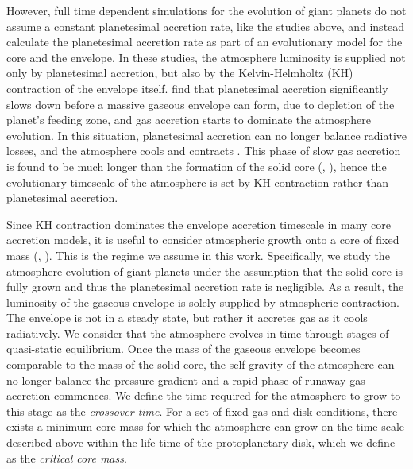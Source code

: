 \documentclass[apj]{emulateapj}
\begin{document}
However, full time dependent simulations for the evolution of giant planets do not assume a constant planetesimal accretion rate, like the studies above, and instead calculate the planetesimal accretion rate as part of an evolutionary model for the core and the envelope. In these studies, the atmosphere luminosity is supplied not only by planetesimal accretion, but also by the Kelvin-Helmholtz (KH) contraction of the envelope itself. \citet{pollack96} find that planetesimal accretion significantly slows down before a massive gaseous envelope can form, due to depletion of the planet's feeding zone, and gas accretion starts to dominate the atmosphere evolution. In this situation, planetesimal accretion can no longer balance radiative losses, and the atmosphere cools and contracts . This phase of slow gas accretion is found to be much longer than the formation of the solid core (\citealt{pollack96}, \citealt{alibert05}), hence the evolutionary timescale of the atmosphere is set by KH contraction rather than planetesimal accretion.

Since KH contraction dominates the envelope accretion timescale in many core accretion models, it is useful to consider atmospheric growth onto a core of fixed mass (\citealt{ikoma00}, \citealt{pn05}). This is the regime we assume in this work. Specifically, we study the atmosphere evolution of giant planets under the assumption that the solid core is fully grown and thus the planetesimal accretion rate is negligible. As a result, the luminosity of the gaseous envelope is solely supplied by atmospheric contraction. The envelope is not in a steady state, but rather it accretes gas as it cools radiatively. We consider that the atmosphere evolves in time through stages of quasi-static equilibrium. Once the mass of the gaseous envelope becomes comparable to the mass of the solid core, the self-gravity of the atmosphere can no longer balance the pressure gradient and a rapid phase of runaway gas accretion commences. We define the time required for the atmosphere to grow to this stage as the \textit{crossover time}. For a set of fixed gas and disk conditions, there exists a minimum core mass for which the atmosphere can grow on the time scale described above within the life time of the protoplanetary disk, which we define as the \textit{critical core mass}. 


\end{document}
